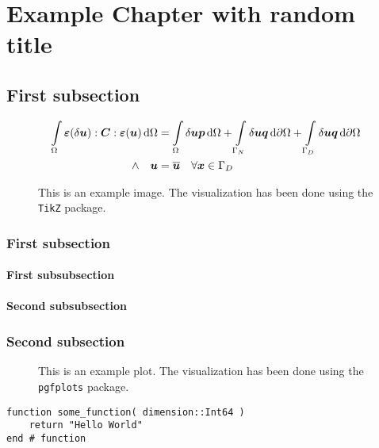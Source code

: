 \chapter{Example Chapter with random title}
\blindtext[3]

\section{First subsection}
\blindtext[4]
\begin{equation}
	\begin{aligned}
		\int \limits_\Omega \boldsymbol{\varepsilon}(\delta\boldsymbol{u}) : \boldsymbol{C} : \boldsymbol{\varepsilon}(\boldsymbol{u})\,\mathrm{d}\Omega
		&= \int \limits_\Omega \delta\boldsymbol{u} \boldsymbol{p}\,\mathrm{d}\Omega
		 + \int \limits_{\Gamma_N} \delta\boldsymbol{u} \boldsymbol{q}\,\mathrm{d}\partial\Omega
		 + \int \limits_{\Gamma_D} \delta\boldsymbol{u} \boldsymbol{q}\,\mathrm{d}\partial\Omega \\
		\land \quad \boldsymbol{u} &= \overline{\boldsymbol{u}} \quad \forall \boldsymbol{x} \in \Gamma_D \\
	\end{aligned}
\end{equation}
\blindtext[2]
\begin{figure}
	\begin{center}
		
	\end{center}
	\caption{This is an example image. The visualization has been done using the \texttt{TikZ} package.}
	\label{fig:example_tikz_image}
\end{figure}
\subsection{First subsection}
 \blindtext[3]
\subsubsection{First subsubsection}
\blindtext[3]
\subsubsection{Second subsubsection}
\blindtext[3]
\subsection{Second subsection}
\blindtext[4]
\begin{figure}
	\begin{center}
		
	\end{center}
	\caption{This is an example plot. The visualization has been done using the \texttt{pgfplots} package.}
	\label{fig:example_tikz_image}
\end{figure}
\cite{bathe2007finite} \blindtext[5]

\begin{lstlisting}[caption = {Example of 'lstlisting' with Julia code}, label = {code:example}, float]
function some_function( dimension::Int64 )
	return "Hello World"
end # function
\end{lstlisting}

